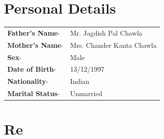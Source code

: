 \documentclass[11pt]{article}
\begin{document}
\begin{minipage}{0.80\linewidth}
\section{\color{yellow}Per\color{black}sonal Details}
\begin{tabular}{l l}
\textbf{Father's Name}-& Mr. Jagdish Pal Chawla\\ 
\textbf{Mother's Name}-& Mrs. Chander Kanta Chawla\\
\textbf{Sex}-& Male\\
\textbf{Date of Birth}-& 13/12/1997\\
\textbf{Nationality}-& Indian\\
\textbf{Marital Status}-& Unmarried\\
\end{tabular}
\section{Re}
\end{minipage}
\end{document}

